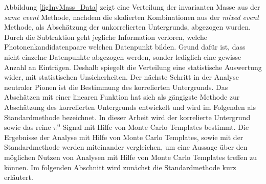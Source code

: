 \newline
Abbildung \ref{figInvMass_Data} zeigt eine Verteilung der invarianten Masse aus der \textit{same event} Methode, nachdem die skalierten Kombinationen aus der \textit{mixed event} Methode, als Abschätzung der unkorrelierten Untergrunds, abgezogen wurden.
Durch die Subtraktion geht jegliche Information verloren, welche Photonenkandidatenpaare welchen Datenpunkt bilden.
Grund dafür ist, dass nicht einzelne Datenpunkte abgezogen werden, sonder lediglich eine gewisse Anzahl an Einträgen.
Deshalb spiegelt die Verteilung eine statistische Auswertung wider, mit statistischen Unsicherheiten.
\newline
Der nächste Schritt in der Analyse neutraler Pionen ist die Bestimmung des korrelierten Untergrunds.
Das Abschätzen mit einer linearen Funktion hat sich als gängigste Methode zur Abschätzung des korrelierten Untergrunds entwickelt und wird im Folgenden als Standardmethode bezeichnet.
In dieser Arbeit wird der korrelierte Untergrund sowie das reine $\pi^{0}$-Signal mit Hilfe von Monte Carlo Templates bestimmt.
Die Ergebnisse der Analyse mit Hilfe von Monte Carlo Templates, sowie mit der Standardmethode werden miteinander vergleichen, um eine Aussage über den möglichen Nutzen von Analysen mit Hilfe von Monte Carlo Templates treffen zu können.
Im folgenden Abschnitt wird zunächst die Standardmethode kurz erläutert.